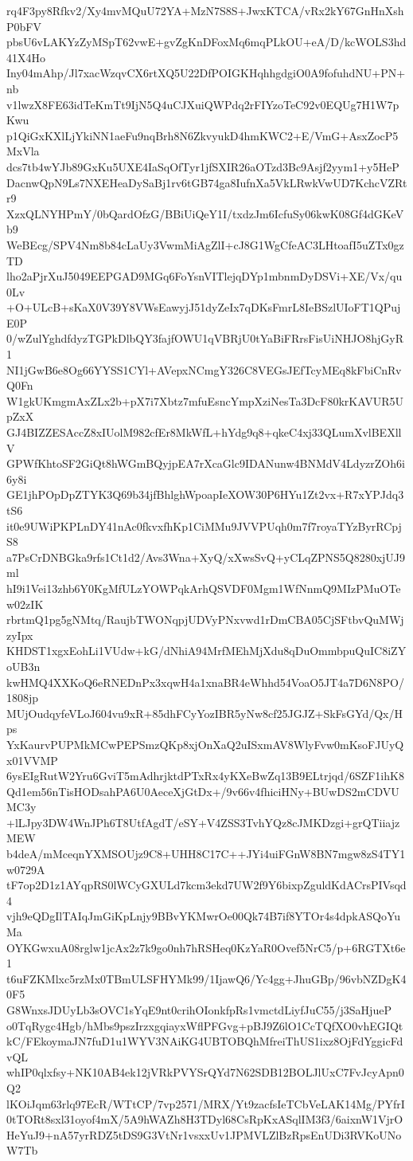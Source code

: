 rq4F3py8Rfkv2/Xy4mvMQuU72YA+MzN7S8S+JwxKTCA/vRx2kY67GnHnXshP0bFV
pbsU6vLAKYzZyMSpT62vwE+gvZgKnDFoxMq6mqPLkOU+eA/D/kcWOLS3hd41X4Ho
Iny04mAhp/Jl7xacWzqvCX6rtXQ5U22DfPOIGKHqhhgdgiO0A9fofuhdNU+PN+nb
v1lwzX8FE63idTeKmTt9IjN5Q4uCJXuiQWPdq2rFIYzoTeC92v0EQUg7H1W7pKwu
p1QiGxKXlLjYkiNN1aeFu9nqBrh8N6ZkvyukD4hmKWC2+E/VmG+AsxZocP5MxVla
dcs7tb4wYJb89GxKu5UXE4IaSqOfTyr1jfSXIR26aOTzd3Bc9Asjf2yym1+y5HeP
DacnwQpN9Ls7NXEHeaDySaBj1rv6tGB74ga8IufnXa5VkLRwkVwUD7KchcVZRtr9
XzxQLNYHPmY/0bQardOfzG/BBiUiQeY1I/txdzJm6IcfuSy06kwK08Gf4dGKeVb9
WeBEcg/SPV4Nm8b84cLaUy3VwmMiAgZlI+cJ8G1WgCfeAC3LHtoafI5uZTx0gzTD
lho2aPjrXuJ5049EEPGAD9MGq6FoYsnVITlejqDYp1mbnmDyDSVi+XE/Vx/qu0Lv
+O+ULcB+sKaX0V39Y8VWsEawyjJ51dyZeIx7qDKsFmrL8IeBSzlUIoFT1QPujE0P
0/wZulYghdfdyzTGPkDlbQY3fajfOWU1qVBRjU0tYaBiFRrsFisUiNHJO8hjGyR1
NI1jGwB6e8Og66YYSS1CYl+AVepxNCmgY326C8VEGsJEfTcyMEq8kFbiCnRvQ0Fn
W1gkUKmgmAxZLx2b+pX7i7Xbtz7mfuEsncYmpXziNesTa3DcF80krKAVUR5UpZxX
GJ4BIZZESAccZ8xIUolM982cfEr8MkWfL+hYdg9q8+qkeC4xj33QLumXvlBEXllV
GPWfKhtoSF2GiQt8hWGmBQyjpEA7rXcaGlc9IDANunw4BNMdV4LdyzrZOh6i6y8i
GE1jhPOpDpZTYK3Q69b34jfBhlghWpoapIeXOW30P6HYu1Zt2vx+R7xYPJdq3tS6
it0e9UWiPKPLnDY41nAc0fkvxfhKp1CiMMu9JVVPUqh0m7f7royaTYzByrRCpjS8
a7PsCrDNBGka9rfs1Ct1d2/Avs3Wna+XyQ/xXwsSvQ+yCLqZPNS5Q8280xjUJ9ml
hI9i1Vei13zhb6Y0KgMfULzYOWPqkArhQSVDF0Mgm1WfNnmQ9MIzPMuOTew02zIK
rbrtmQ1pg5gNMtq/RaujbTWONqpjUDVyPNxvwd1rDmCBA05CjSFtbvQuMWjzyIpx
KHDST1xgxEohLi1VUdw+kG/dNhiA94MrfMEhMjXdu8qDuOmmbpuQuIC8iZYoUB3n
kwHMQ4XXKoQ6eRNEDnPx3xqwH4a1xnaBR4eWhhd54VoaO5JT4a7D6N8PO/1808jp
MUjOudqyfeVLoJ604vu9xR+85dhFCyYozIBR5yNw8cf25JGJZ+SkFsGYd/Qx/Hps
YxKaurvPUPMkMCwPEPSmzQKp8xjOnXaQ2uISxmAV8WlyFvw0mKsoFJUyQx01VVMP
6ysEIgRutW2Yru6GviT5mAdhrjktdPTxRx4yKXeBwZq13B9ELtrjqd/6SZF1ihK8
Qd1em56nTisHODsahPA6U0AeceXjGtDx+/9v66v4fhiciHNy+BUwDS2mCDVUMC3y
+lLJpy3DW4WnJPh6T8UtfAgdT/eSY+V4ZSS3TvhYQz8cJMKDzgi+grQTiiajzMEW
b4deA/mMceqnYXMSOUjz9C8+UHH8C17C++JYi4uiFGnW8BN7mgw8zS4TY1w0729A
tF7op2D1z1AYqpRS0lWCyGXULd7kcm3ekd7UW2f9Y6bixpZguldKdACrsPIVsqd4
vjh9eQDgIlTAIqJmGiKpLnjy9BBvYKMwrOe00Qk74B7if8YTOr4s4dpkASQoYuMa
OYKGwxuA08rglw1jcAx2z7k9go0nh7hRSHeq0KzYaR0Ovef5NrC5/p+6RGTXt6e1
t6uFZKMlxc5rzMx0TBmULSFHYMk99/1IjawQ6/Yc4gg+JhuGBp/96vbNZDgK40F5
G8WnxsJDUyLb3sOVC1sYqE9nt0crihOIonkfpRs1vmctdLiyfJuC55/j3SaHjueP
o0TqRygc4Hgb/hMbs9pszIrzxgqiayxWflPFGvg+pBJ9Z6lO1CcTQfXO0vhEGIQt
kC/FEkoymaJN7fuD1u1WYV3NAiKG4UBTOBQhMfreiThUS1ixz8OjFdYggicFdvQL
whIP0qlxfsy+NK10AB4ek12jVRkPVYSrQYd7N62SDB12BOLJlUxC7FvJcyApn0Q2
lKOiJqm63rlq97EcR/WTtCP/7vp2571/MRX/Yt9zacfsIeTCbVeLAK14Mg/PYfrI
0tTORt8sxl31oyof4mX/5A9hWAZh8H3TDyl68CsRpKxASqlIM3f3/6aixnW1VjrO
HeYuJ9+nA57yrRDZ5tDS9G3VtNr1vsxxUv1JPMVLZlBzRpsEnUDi3RVKoUNoW7Tb
